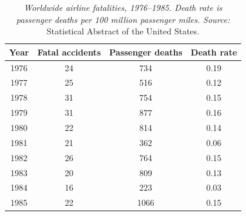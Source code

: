 \documentclass{article}
\begin{document}
\begin{table}
\begin{center}
\begin{tabular}{ c c c c }
	Year & Fatal accidents & Passenger deaths & Death rate\\
	\hline
	1976 & 24 & 734 & 0.19\\
	1977 & 25 & 516 & 0.12\\
	1978 & 31 & 754 & 0.15\\
	1979 & 31 & 877 & 0.16\\
	1980 & 22 & 814 & 0.14\\
	1981 & 21 & 362 & 0.06\\
	1982 & 26 & 764 & 0.15\\
	1983 & 20 & 809 & 0.13\\
	1984 & 16 & 223 & 0.03\\
	1985 & 22 & 1066 & 0.15
\end{tabular}
\label{table:2.11.13}
\caption{\textit{Worldwide airline fatalities, 1976--1985. Death rate is passenger deaths per 100 million passenger miles. Source:} Statistical Abstract of the United States.}
\end{center}
\end{table}
\end{document}
